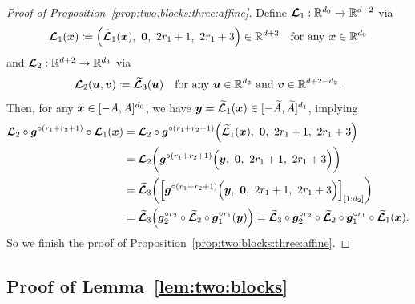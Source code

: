 \documentclass[nohyperref]{article}
\theoremstyle{plain}
\theoremstyle{definition}
\theoremstyle{remark}
\begin{document}
\begin{proof}[Proof of Proposition~\ref{prop:two:blocks:three:affine}]
	Define $\bmcalL_1:\R^{d_0}\to \R^{d+2}$ via
	\begin{equation*}
		\bmcalL_1(\bmx)\coloneqq \Big(
		\bmtildecalL_1(\bmx),\   \bmzero,\  2r_1+1,
		\  2r_1+3\Big)\in\R^{d+2} \quad \tn{for any $\bmx\in \R^{d_0}$}
	\end{equation*}
	and 
	$\bmcalL_2:\R^{d+2}\to \R^{d_3}$ via
	\begin{equation*}
		\bmcalL_2(\bmu,\bmv)\coloneqq 
		\bmtildecalL_3(\bmu) \quad \tn{for any $\bmu\in \R^{d_2}$ and $\bmv\in \R^{d+2-d_2}$}.
	\end{equation*}
	Then, for any ${\bm{x}}\in [-A,A]^{d_0}$, we have ${\bm{y}}={\bm{\mathcal{\widetilde{L}}}}_1({\bm{x}})\in [-{\widetilde{A}},{\widetilde{A}}]^{d_1}$, implying
	\begin{equation*}
		\begin{split}
			{\bm{\mathcal{L}}}_2\circ {\bm{g}}^{\circ (r_1+r_2+1)}\circ {\bm{\mathcal{L}}}_1({\bm{x}})
			& = {\bm{\mathcal{L}}}_2\circ {\bm{g}}^{\circ (r_1+r_2+1)}\Big(
			{\bm{\mathcal{\widetilde{L}}}}_1({\bm{x}}),\   {\bm{0}},\  2r_1+1,
			\  2r_1+3\Big)\\
			& = {\bm{\mathcal{L}}}_2\bigg({\bm{g}}^{\circ (r_1+r_2+1)}\Big(
			{\bm{y}},\   {\bm{0}},\  2r_1+1,
			\  2r_1+3\Big)\bigg)\\
			& = {\bm{\mathcal{\widetilde{L}}}}_3\bigg(\Big[{\bm{g}}^{\circ (r_1+r_2+1)}\Big(
			{\bm{y}},\   {\bm{0}},\  2r_1+1,
			\  2r_1+3\Big)\Big]_{[1:d_2]}\bigg)\\
			&= {\bm{\mathcal{\widetilde{L}}}}_3\Big({\bm{g}}_2^{\circ r_2}\circ{\bm{\mathcal{\widetilde{L}}}}_2\circ{\bm{g}}_1^{\circ r_1}({\bm{y}})\Big)
			={\bm{\mathcal{\widetilde{L}}}}_3\circ {\bm{g}}_2^{\circ r_2}\circ{\bm{\mathcal{\widetilde{L}}}}_2\circ{\bm{g}}_1^{\circ r_1}\circ {\bm{\mathcal{\widetilde{L}}}}_1({\bm{x}}).
		\end{split}
	\end{equation*}
	So we finish the proof of Proposition~\ref{prop:two:blocks:three:affine}. 
\end{proof}




\subsection{Proof of Lemma~\ref{lem:two:blocks}}
\label{sec:proof:lem:two:blocks}

\end{document}
